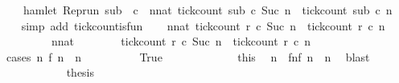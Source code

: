 \begin{isabellebody}
\isanewline
\ \ \ \ {}{\isacharcolon}{\isacartoucheopen}{\isacharparenleft}{\isasymnot}hamlet\ {\isacharparenleft}{\isacharparenleft}Rep{\isacharunderscore}run\ sub{\isacharparenright}\ {}\ c\ {\isasymand}\ {\isacharparenleft}{\isasymforall}n{\isacharcolon}{\isacharcolon}nat{\isachardot}\ {\isacharparenleft}tick{\isacharunderscore}count\ sub\ c\ {\isacharparenleft}Suc\ n{\isacharparenright}{\isacharparenright}\ {\isasymle}\ {\isacharparenleft}tick{\isacharunderscore}count\ sub\ c\ n{\isacharparenright}{\isacharparenright}{\isacartoucheclose}\isanewline
\ \ \isamarkupfalse%
\ {\isacharparenleft}simp\ add{\isacharcolon}\ tick{\isacharunderscore}count{\isacharunderscore}is{\isacharunderscore}fun{\isacharparenright}\isanewline
\ \ \isamarkupfalse%
\ {\isacartoucheopen}{\isasymforall}n{\isacharcolon}{\isacharcolon}nat{\isachardot}\ {\isacharparenleft}tick{\isacharunderscore}count\ r\ c\ {\isacharparenleft}Suc\ n{\isacharparenright}{\isacharparenright}\ {\isasymle}\ {\isacharparenleft}tick{\isacharunderscore}count\ r\ c\ n{\isacharparenright}{\isacartoucheclose}\isanewline
\ \ \isamarkupfalse%
\ {\isacharminus}\isanewline
\ \ \ \ \isacommand{{\isacharbraceleft}}\isamarkupfalse%
\ \isamarkupfalse%
\ n{\isacharcolon}{\isacharcolon}nat\isanewline
\ \ \ \ \ \ \isamarkupfalse%
\ {\isacartoucheopen}tick{\isacharunderscore}count\ r\ c\ {\isacharparenleft}Suc\ n{\isacharparenright}\ {\isasymle}\ tick{\isacharunderscore}count\ r\ c\ n{\isacartoucheclose}\isanewline
\ \ \ \ \ \ \isamarkupfalse%
\ {\isacharparenleft}cases\ {\isacartoucheopen}{\isasymexists}n\ f\ n\ {\isacharequal}\ n{\isacartoucheclose}{\isacharparenright}\isanewline
\ \ \ \ \ \ \ \ \isamarkupfalse%
\ True\ %
\isanewline
\ \ \ \ \ \ \ \ \ \ \isamarkupfalse%
\ this\ \isamarkupfalse%
\ n\ \ fn{\isacharcolon}{\isacartoucheopen}f\ n\ {\isacharequal}\ n{\isacartoucheclose}\ \isamarkupfalse%
\ blast\isanewline
\ \ \ \ \ \ \ \ \ \ \isamarkupfalse%
\ {\isacharquery}thesis\isanewline
\ \ \ \ \ \ \ \ \ \ \isamarkupfalse%

\end{isabellebody}
